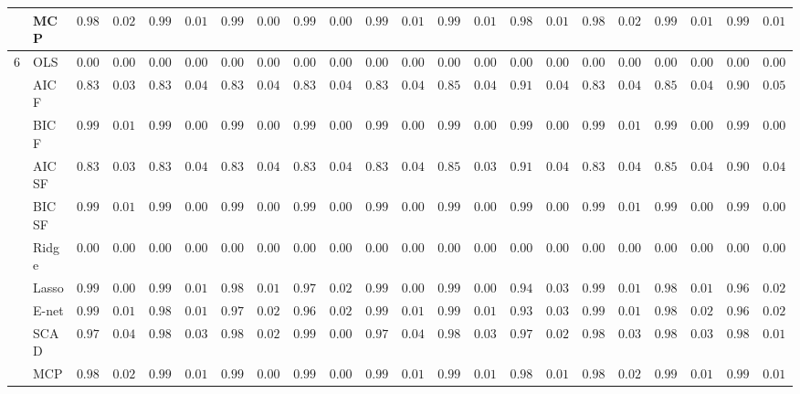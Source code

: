 \begin{tabular}{p{0.2cm}p{1cm}|p{0.6cm}p{0.6cm}|p{0.6cm}p{0.6cm}p{0.6cm}p{0.6cm}p{0.6cm}p{0.6cm}|p{0.6cm}p{0.6cm}p{0.6cm}p{0.6cm}p{0.6cm}p{0.6cm}|p{0.6cm}p{0.6cm}p{0.6cm}p{0.6cm}p{0.6cm}p{0.6cm}}
 & MCP  & $0.9898$ & $0.0211$ & $0.9915$ & $0.0193$ & $0.9962$ & $0.0095$ & $0.9984$ & $0.0050$ & $0.9911$ & $0.0176$ & $0.9931$ & $0.0173$ & $0.9850$ & $0.0168$ & $0.9895$ & $0.0234$ & $0.9928$ & $0.0159$ & $0.9900$ & $0.0106$ \\\hline
6 & OLS  & $0.0000$ & $0.0000$ & $0.0000$ & $0.0000$ & $0.0000$ & $0.0000$ & $0.0000$ & $0.0000$ & $0.0000$ & $0.0000$ & $0.0000$ & $0.0000$ & $0.0000$ & $0.0000$ & $0.0000$ & $0.0000$ & $0.0000$ & $0.0000$ & $0.0000$ & $0.0000$ \\
 & AIC F  & $0.8329$ & $0.0391$ & $0.8353$ & $0.0419$ & $0.8341$ & $0.0421$ & $0.8306$ & $0.0481$ & $0.8366$ & $0.0447$ & $0.8506$ & $0.0408$ & $0.9124$ & $0.0434$ & $0.8367$ & $0.0438$ & $0.8538$ & $0.0428$ & $0.9071$ & $0.0505$ \\
 & BIC F  & $0.9905$ & $0.0112$ & $0.9928$ & $0.0099$ & $0.9919$ & $0.0087$ & $0.9922$ & $0.0088$ & $0.9906$ & $0.0098$ & $0.9932$ & $0.0076$ & $0.9960$ & $0.0061$ & $0.9901$ & $0.0103$ & $0.9929$ & $0.0087$ & $0.9967$ & $0.0071$ \\
 & AIC SF  & $0.8334$ & $0.0389$ & $0.8364$ & $0.0413$ & $0.8354$ & $0.0403$ & $0.8316$ & $0.0474$ & $0.8377$ & $0.0436$ & $0.8530$ & $0.0397$ & $0.9152$ & $0.0421$ & $0.8390$ & $0.0416$ & $0.8548$ & $0.0421$ & $0.9080$ & $0.0494$ \\
 & BIC SF  & $0.9905$ & $0.0112$ & $0.9928$ & $0.0099$ & $0.9919$ & $0.0087$ & $0.9922$ & $0.0088$ & $0.9906$ & $0.0098$ & $0.9932$ & $0.0076$ & $0.9960$ & $0.0061$ & $0.9902$ & $0.0100$ & $0.9929$ & $0.0087$ & $0.9967$ & $0.0071$ \\
 & Ridge  & $0.0000$ & $0.0000$ & $0.0000$ & $0.0000$ & $0.0000$ & $0.0000$ & $0.0000$ & $0.0000$ & $0.0000$ & $0.0000$ & $0.0000$ & $0.0000$ & $0.0000$ & $0.0000$ & $0.0000$ & $0.0000$ & $0.0000$ & $0.0000$ & $0.0000$ & $0.0000$ \\
 & Lasso  & $0.9969$ & $0.0087$ & $0.9936$ & $0.0141$ & $0.9882$ & $0.0161$ & $0.9788$ & $0.0243$ & $0.9960$ & $0.0086$ & $0.9954$ & $0.0089$ & $0.9436$ & $0.0320$ & $0.9943$ & $0.0129$ & $0.9874$ & $0.0174$ & $0.9696$ & $0.0209$ \\
 & E-net  & $0.9943$ & $0.0145$ & $0.9883$ & $0.0195$ & $0.9778$ & $0.0222$ & $0.9696$ & $0.0268$ & $0.9934$ & $0.0124$ & $0.9906$ & $0.0145$ & $0.9311$ & $0.0361$ & $0.9907$ & $0.0168$ & $0.9804$ & $0.0229$ & $0.9617$ & $0.0225$ \\
 & SCAD  & $0.9791$ & $0.0413$ & $0.9828$ & $0.0353$ & $0.9889$ & $0.0207$ & $0.9972$ & $0.0082$ & $0.9785$ & $0.0443$ & $0.9846$ & $0.0384$ & $0.9727$ & $0.0277$ & $0.9834$ & $0.0349$ & $0.9840$ & $0.0310$ & $0.9826$ & $0.0174$ \\
 & MCP  & $0.9898$ & $0.0211$ & $0.9915$ & $0.0193$ & $0.9962$ & $0.0095$ & $0.9984$ & $0.0050$ & $0.9911$ & $0.0176$ & $0.9931$ & $0.0173$ & $0.9850$ & $0.0168$ & $0.9895$ & $0.0234$ & $0.9928$ & $0.0159$ & $0.9900$ & $0.0106$ \\
\hline 
\end{tabular}

